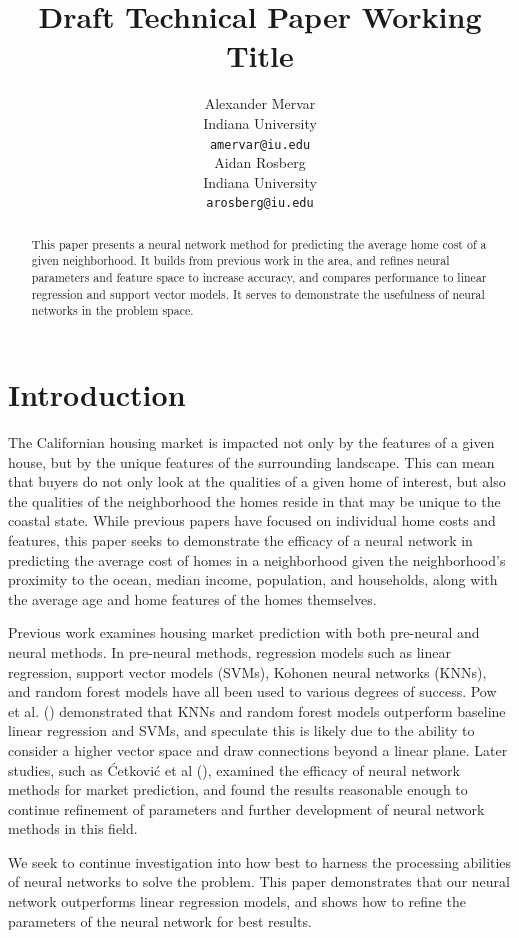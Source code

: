 \documentclass[11pt]{article}
\title{Draft Technical Paper Working Title}
\author{Alexander Mervar \\
 Indiana University \\
 \texttt{amervar@iu.edu} \\\And
 Aidan Rosberg \\
 Indiana University \\
 \texttt{arosberg@iu.edu}\\}
\begin{document}
\maketitle
\begin{abstract}
This paper presents a neural network method for predicting the average home cost of a given neighborhood. It builds from previous work in the area, and refines neural parameters and feature space to increase accuracy, and compares performance to linear regression and support vector models. It serves to demonstrate the usefulness of neural networks in the problem space.
\end{abstract}

\section{Introduction}

The Californian housing market is impacted not only by the features of a given house, but by the unique features of the surrounding landscape. This can mean that buyers do not only look at the qualities of a given home of interest, but also the qualities of the neighborhood the homes reside in that may be unique to the coastal state. While previous papers have focused on individual home costs and features, this paper seeks to demonstrate the efficacy of a neural network in predicting the average cost of homes in a neighborhood given the neighborhood’s proximity to the ocean, median income, population, and households, along with the average age and home features of the homes themselves.

Previous work examines housing market prediction with both pre-neural and neural methods. In pre-neural methods, regression models such as linear regression, support vector models (SVMs), Kohonen neural networks (KNNs), and random forest models have all been used to various degrees of success. Pow et al. (\citeyear{Pow2014}) demonstrated that KNNs and random forest models outperform baseline linear regression and SVMs, and speculate this is likely due to the ability to consider a higher vector space and draw connections beyond a linear plane. Later studies, such as Ćetković et al (\citeyear{Cetkovic2018}), examined the efficacy of neural network methods for market prediction, and found the results reasonable enough to continue refinement of parameters and further development of neural network methods in this field.

We seek to continue investigation into how best to harness the processing abilities of neural networks to solve the problem. This paper demonstrates that our neural network outperforms linear regression models, and shows how to refine the parameters of the neural network for best results.
\end{document}

